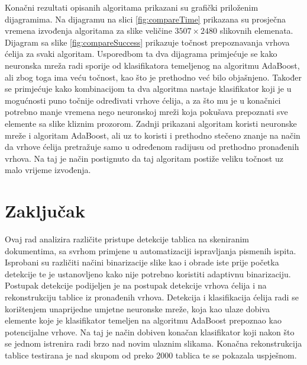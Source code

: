 \documentclass[times, utf8, zavrsni, numeric]{fer}
\begin{document}
Konačni rezultati opisanih algoritama prikazani su grafički priloženim dijagramima.
Na dijagramu na slici \ref{fig:compareTime} prikazana su prosječna vremena izvođenja algoritama za slike veličine $3507\times2480$ slikovnih elemenata.
Dijagram sa slike \ref{fig:compareSuccess} prikazuje točnost prepoznavanja vrhova ćelija za svaki algoritam.
Usporedbom ta dva dijagrama primjećuje se kako neuronska mreža radi sporije od klasifikatora temeljenog na algoritmu AdaBoost, ali zbog toga ima veću točnost, kao što je prethodno već bilo objašnjeno.
Također se primjećuje kako kombinacijom ta dva algoritma nastaje klasifikator koji je u mogućnosti puno točnije određivati vrhove ćelija, a za što mu je u konačnici potrebno manje vremena nego neuronskoj mreži koja pokušava prepoznati sve elemente sa slike kliznim prozorom.
Zadnji prikazani algoritam koristi neuronske mreže i algoritam AdaBoost, ali uz to koristi i prethodno stečeno znanje na način da vrhove ćelija pretražuje samo u određenom radijusu od prethodno pronađenih vrhova.
Na taj je način postignuto da taj algoritam postiže veliku točnost uz malo vrijeme izvođenja.

\chapter{Zaključak}
\label{ch:conclusion}
Ovaj rad analizira različite pristupe detekcije tablica na skeniranim dokumentima, sa svrhom primjene u automatizaciji ispravljanja pismenih ispita.
Isprobani su različiti načini binarizacije slike kao i obrade iste prije početka detekcije te je ustanovljeno kako nije potrebno koristiti adaptivnu binarizaciju.
Postupak detekcije podijeljen je na postupak detekcije vrhova ćelija i na rekonstrukciju tablice iz pronađenih vrhova.
Detekcija i klasifikacija ćelija radi se korištenjem unaprijedne umjetne neuronske mreže, koja kao ulaze dobiva elemente koje je klasifikator temeljen na algoritmu AdaBoost prepoznao kao potencijalne vrhove.
Na taj je način dobiven konačan klasifikator koji nakon što se jednom istrenira radi brzo nad novim ulaznim slikama.
Konačna rekonstrukcija tablice testirana je nad skupom od preko $2000$ tablica te se pokazala uspješnom.





\end{document}
